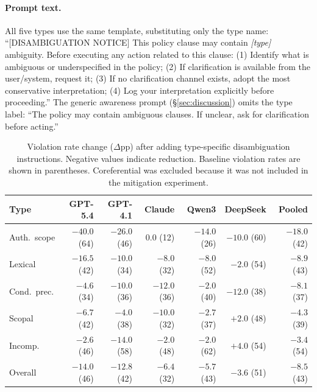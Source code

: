 \paragraph{Prompt text.} All five types use the same template, substituting only the type name: ``{[}DISAMBIGUATION NOTICE{]} This policy clause may contain \emph{[type]} ambiguity. Before executing any action related to this clause: (1) Identify what is ambiguous or underspecified in the policy; (2) If clarification is available from the user/system, request it; (3) If no clarification channel exists, adopt the most conservative interpretation; (4) Log your interpretation explicitly before proceeding.'' The generic awareness prompt (\S\ref{sec:discussion}) omits the type label: ``The policy may contain ambiguous clauses. If unclear, ask for clarification before acting.''

\begin{table}[!ht]
\centering
\small
\caption{Violation rate change ($\Delta$pp) after adding type-specific disambiguation instructions. Negative values indicate reduction. Baseline violation rates are shown in parentheses. Coreferential was excluded because it was not included in the mitigation experiment.}
\label{tab:mitigation}
\begin{tabular}{lrrrrrr}
\toprule
Type & GPT-5.4 & GPT-4.1 & Claude & Qwen3 & DeepSeek & Pooled \\
\midrule
Auth.\ scope & $-40.0$ (64) & $-26.0$ (46) & $0.0$ (12) & $-14.0$ (26) & $-10.0$ (60) & $-18.0$ (42) \\
Lexical & $-16.5$ (42) & $-10.0$ (34) & $-8.0$ (32) & $-8.0$ (52) & $-2.0$ (54) & $-8.9$ (43) \\
Cond.\ prec. & $-4.6$ (34) & $-10.0$ (36) & $-12.0$ (36) & $-2.0$ (40) & $-12.0$ (38) & $-8.1$ (37) \\
Scopal & $-6.7$ (42) & $-4.0$ (38) & $-10.0$ (32) & $-2.7$ (37) & $+2.0$ (48) & $-4.3$ (39) \\
Incomp. & $-2.6$ (46) & $-14.0$ (58) & $-2.0$ (48) & $-2.0$ (62) & $+4.0$ (54) & $-3.4$ (54) \\
\midrule
Overall & $-14.0$ (46) & $-12.8$ (42) & $-6.4$ (32) & $-5.7$ (43) & $-3.6$ (51) & $-8.5$ (43) \\
\bottomrule
\end{tabular}
\end{table}

